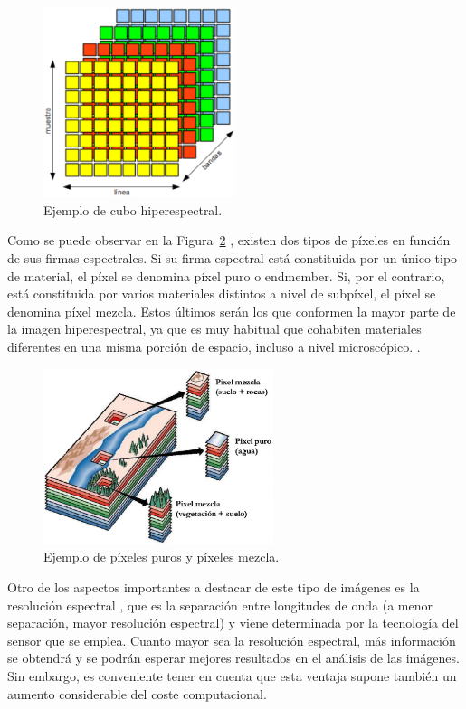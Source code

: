 \begin{figure}
  \centering
    \includegraphics[width=0.5\textwidth]{Imagenes/CuboHiperespectral.png}
  \caption{Ejemplo de cubo hiperespectral.}
  \label{fig:cubo hiperespectral}
\end{figure}

Como se puede observar en la Figura~\ref{fig:pixeles puros y pixeles mezcla} \cite{biblio:TFM_Pablo_VCA}, existen dos tipos de píxeles en función de sus firmas espectrales. Si su firma espectral está constituida por un único tipo de material, el píxel se denomina píxel puro o endmember. Si, por el contrario, está constituida por varios materiales distintos a nivel de subpíxel, el píxel se denomina píxel mezcla. Estos últimos serán los que conformen la mayor parte de la imagen hiperespectral, ya que es muy habitual que cohabiten materiales diferentes en una misma porción de espacio, incluso a nivel microscópico. \cite{biblio:x}.

\begin{figure}
  \centering
    \includegraphics[width=0.6\textwidth]{Imagenes/PixelesPurosPixelesMezcla.png}
  \caption{Ejemplo de píxeles puros y píxeles mezcla.}
  \label{fig:pixeles puros y pixeles mezcla}
\end{figure}

Otro de los aspectos importantes a destacar de este tipo de imágenes es la resolución espectral \cite{biblio:TFM_Pablo_VCA}, que es la separación entre longitudes de onda (a menor separación, mayor resolución espectral) y viene determinada por la tecnología del sensor que se emplea. Cuanto mayor sea la resolución espectral, más información se obtendrá y se podrán esperar mejores resultados en el análisis de las imágenes. Sin embargo, es conveniente tener en cuenta que esta ventaja supone también un aumento considerable del coste computacional.

